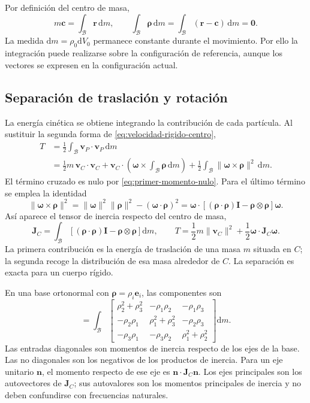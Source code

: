 \documentclass[11pt,a4paper,oneside]{report}
\newcommand{\vct}[1]{\bm{#1}}
\newcommand{\ten}[1]{\boldsymbol{#1}}
\newcommand{\dd}{\mathrm d}
\newcommand{\Id}{\mathbf I}
\begin{document}
Por definición del centro de masa,
\begin{equation}
 m\vct c=\int_{\mathcal B}\vct r\,\dd m,\qquad
 \int_{\mathcal B}\vct\rho\,\dd m
 =\int_{\mathcal B}(\vct r-\vct c)\,\dd m=\vct0.
 \label{eq:primer-momento-nulo}
\end{equation}
La medida $\dd m=\rho_0\dd V_0$ permanece constante durante el movimiento. Por ello la integración puede realizarse sobre la configuración de referencia, aunque los vectores se expresen en la configuración actual.

\subsection{Separación de traslación y rotación}
La energía cinética se obtiene integrando la contribución de cada partícula. Al sustituir la segunda forma de \eqref{eq:velocidad-rigido-centro},
\begin{align}
 T&=\frac12\int_{\mathcal B}\vct v_P\cdot\vct v_P\,\dd m\nonumber\\
 &=\frac12m\,\vct v_C\cdot\vct v_C
 +\vct v_C\cdot\left(\vct\omega\times
             \int_{\mathcal B}\vct\rho\,\dd m\right)
 +\frac12\int_{\mathcal B}\|\vct\omega\times\vct\rho\|^2\,\dd m.
 \label{eq:T-desarrollo}
\end{align}
El término cruzado es nulo por \eqref{eq:primer-momento-nulo}. Para el último término se emplea la identidad
\begin{equation}
 \|\vct\omega\times\vct\rho\|^2
 =\|\vct\omega\|^2\|\vct\rho\|^2-(\vct\omega\cdot\vct\rho)^2
 =\vct\omega\cdot
   \left[(\vct\rho\cdot\vct\rho)\Id-\vct\rho\otimes\vct\rho\right]\vct\omega.
\end{equation}
Así aparece el tensor de inercia respecto del centro de masa,
\begin{equation}
 \ten J_C=\int_{\mathcal B}
       \left[(\vct\rho\cdot\vct\rho)\Id-\vct\rho\otimes\vct\rho\right]\dd m,
 \qquad
 T=\frac12m\|\vct v_C\|^2+\frac12\vct\omega\cdot\ten J_C\vct\omega.
 \label{eq:T-centro}
\end{equation}
La primera contribución es la energía de traslación de una masa $m$ situada en $C$; la segunda recoge la distribución de esa masa alrededor de $C$. La separación es exacta para un cuerpo rígido.

En una base ortonormal con $\vct\rho=\rho_i\vct e_i$, las componentes son
\begin{equation}
 [\ten J_C]=\int_{\mathcal B}
 \begin{bmatrix}
 \rho_2^2+\rho_3^2&-\rho_1\rho_2&-\rho_1\rho_3\\
 -\rho_2\rho_1&\rho_1^2+\rho_3^2&-\rho_2\rho_3\\
 -\rho_3\rho_1&-\rho_3\rho_2&\rho_1^2+\rho_2^2
 \end{bmatrix}\dd m.
 \label{eq:J-componentes}
\end{equation}
Las entradas diagonales son momentos de inercia respecto de los ejes de la base. Las no diagonales son los negativos de los productos de inercia. Para un eje unitario $\vct n$, el momento respecto de ese eje es $\vct n\cdot\ten J_C\vct n$. Los ejes principales son los autovectores de $\ten J_C$; sus autovalores son los momentos principales de inercia y no deben confundirse con frecuencias naturales.
\end{document}
